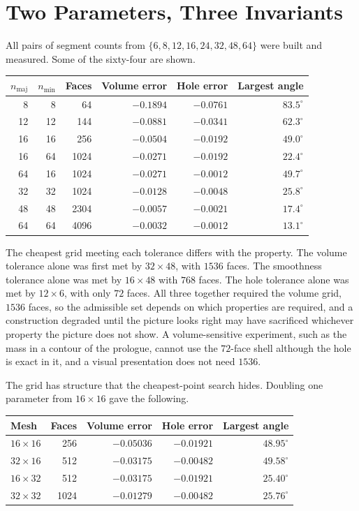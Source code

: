 \section{Two Parameters, Three Invariants}

All pairs of segment counts from $\{6,8,12,16,24,32,48,64\}$ were built and measured. Some of the sixty-four are shown.

\begin{center}
\small
\begin{tabular}{rrrrrr}
\toprule
$n_{\mathrm{maj}}$ & $n_{\mathrm{min}}$ & Faces & Volume error & Hole error & Largest angle\\
\midrule
8 & 8 & 64 & $-0.1894$ & $-0.0761$ & $83.5^{\circ}$\\
12 & 12 & 144 & $-0.0881$ & $-0.0341$ & $62.3^{\circ}$\\
16 & 16 & 256 & $-0.0504$ & $-0.0192$ & $49.0^{\circ}$\\
16 & 64 & 1024 & $-0.0271$ & $-0.0192$ & $22.4^{\circ}$\\
64 & 16 & 1024 & $-0.0271$ & $-0.0012$ & $49.7^{\circ}$\\
32 & 32 & 1024 & $-0.0128$ & $-0.0048$ & $25.8^{\circ}$\\
48 & 48 & 2304 & $-0.0057$ & $-0.0021$ & $17.4^{\circ}$\\
64 & 64 & 4096 & $-0.0032$ & $-0.0012$ & $13.1^{\circ}$\\
\bottomrule
\end{tabular}
\end{center}

The cheapest grid meeting each tolerance differs with the property. The volume tolerance alone was first met by $32\times 48$, with $1536$ faces. The smoothness tolerance alone was met by $16\times 48$ with $768$ faces. The hole tolerance alone was met by $12\times 6$, with only $72$ faces. All three together required the volume grid, $1536$ faces, so the admissible set depends on which properties are required, and a construction degraded until the picture looks right may have sacrificed whichever property the picture does not show. A volume-sensitive experiment, such as the mass in a contour of the prologue, cannot use the $72$-face shell although the hole is exact in it, and a visual presentation does not need $1536$.

The grid has structure that the cheapest-point search hides. Doubling one parameter from $16\times 16$ gave the following.

\begin{center}
\small
\begin{tabular}{lrrrr}
\toprule
Mesh & Faces & Volume error & Hole error & Largest angle\\
\midrule
$16\times 16$ & 256 & $-0.05036$ & $-0.01921$ & $48.95^{\circ}$\\
$32\times 16$ & 512 & $-0.03175$ & $-0.00482$ & $49.58^{\circ}$\\
$16\times 32$ & 512 & $-0.03175$ & $-0.01921$ & $25.40^{\circ}$\\
$32\times 32$ & 1024 & $-0.01279$ & $-0.00482$ & $25.76^{\circ}$\\
\bottomrule
\end{tabular}
\end{center}

